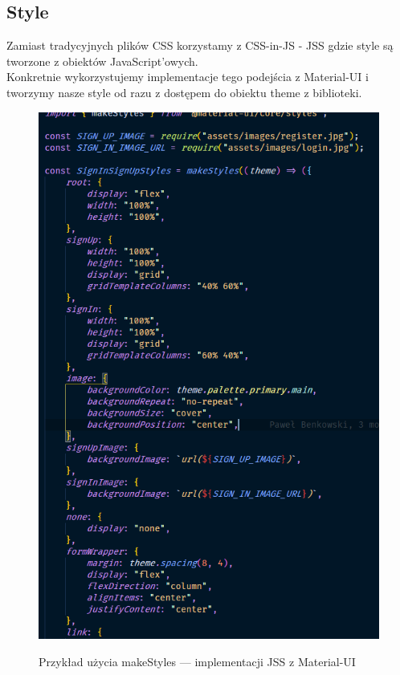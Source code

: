 \documentclass[a4paper,11pt]{report}
\begin{document}
\subsection{Style}
\label{subsec:style}
Zamiast tradycyjnych plików CSS korzystamy z CSS-in-JS - JSS gdzie style są tworzone z obiektów JavaScript'owych.\\
Konkretnie wykorzystujemy implementacje tego podejścia z Material-UI i tworzymy nasze style od razu z dostępem do obiektu theme z biblioteki.
\begin{figure}[H]
	\centering
	\includegraphics[scale=0.5]{implementacja/frontend/jss_styles}\\
	\caption{Przykład użycia makeStyles — implementacji JSS z Material-UI}
	\label{fig:jss_styles}
\end{figure}
\end{document}
